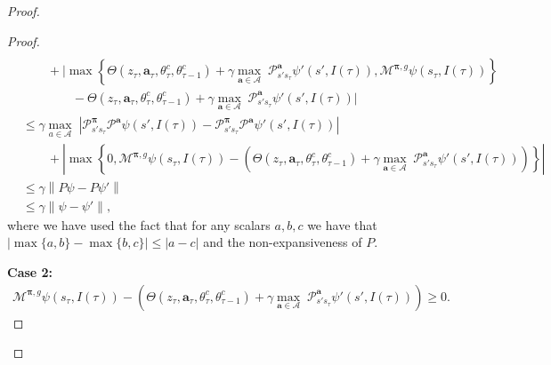 \documentclass{article}
\begin{document}
\begin{proof}
\begin{proof}
\begin{align*}
\\&\qquad+\Bigg|\max\left\{\Theta(z_\tau,\boldsymbol{a}_\tau,\theta^c_{\tau},\theta^c_{\tau-1})+\gamma\underset{\boldsymbol{a}\in\boldsymbol{\mathcal{A}}}{\max}\;\mathcal{P}^{\boldsymbol{a}}_{s's_\tau}\psi'(s',I({\tau})),\mathcal{M}^{\boldsymbol{\pi},g}\psi(s_{\tau},I(\tau))\right\}\\&\qquad\qquad-\Theta(z_\tau,\boldsymbol{a}_\tau,\theta^c_{\tau},\theta^c_{\tau-1})+\gamma\underset{\boldsymbol{a}\in\boldsymbol{\mathcal{A}}}{\max}\;\mathcal{P}^{\boldsymbol{a}}_{s's_\tau}\psi'(s',I(\tau))\Bigg|
\\&\leq \gamma\underset{a\in\mathcal{A}}{\max}\;\left|\mathcal{P}^{\boldsymbol{\pi}}_{s's_\tau}\mathcal{P}^{\boldsymbol{a}}\psi(s',I(\tau))-\mathcal{P}^{\boldsymbol{\pi}}_{s's_\tau}\mathcal{P}^{\boldsymbol{a}}\psi'(s',I(\tau))\right|
\\&\qquad+\left|\max\left\{0,\mathcal{M}^{\boldsymbol{\pi},g}\psi(s_{\tau},I(\tau))-\left(\Theta(z_\tau,\boldsymbol{a}_\tau,\theta^c_{\tau},\theta^c_{\tau-1})+\gamma\underset{\boldsymbol{a}\in\boldsymbol{\mathcal{A}}}{\max}\;\mathcal{P}^{\boldsymbol{a}}_{s's_\tau}\psi'(s',I(\tau))\right)\right\}\right|
\\&\leq \gamma\left\|P\psi-P\psi'\right\|
\\&\leq \gamma\|\psi-\psi'\|,
\end{align*}
where we have used the fact that for any scalars $a,b,c$ we have that $
    \left|\max\{a,b\}-\max\{b,c\}\right|\leq \left|a-c\right|$ and the non-expansiveness of $P$.



\textbf{Case 2: }
\begin{align*}\mathcal{M}^{\boldsymbol{\pi},g}\psi(s_{\tau},I(\tau))-\left(\Theta(z_\tau,\boldsymbol{a}_\tau,\theta^c_{\tau},\theta^c_{\tau-1})+\gamma\underset{\boldsymbol{a}\in\boldsymbol{\mathcal{A}}}{\max}\;\mathcal{P}^{\boldsymbol{a}}_{s's_\tau}\psi'(s',I(\tau))\right)\geq 0.
\end{align*}


\end{proof}
\end{proof}
\end{document}
